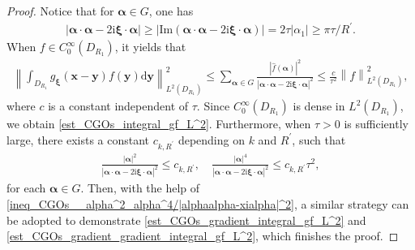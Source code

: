 \documentclass[11pt,reqno,oneside]{amsart}
\theoremstyle{definition}
\theoremstyle{remark}
\numberwithin{equation}{section}
\numberwithin{equation}{section}
\theoremstyle{remark}
\begin{document}
\begin{proof}
	Notice that for $ \bm{\alpha} \in G $, one has
	\begin{align} \label{ineq_CGOs_alphaalpha-2ixialpha}
		\left| \bm{\alpha} \cdot \bm{\alpha} - 2 \mathrm{i} \bm{\xi} \cdot \bm{\alpha} \right| \geqslant \left| \mathrm{Im}\left(\bm{\alpha} \cdot \bm{\alpha} - 2 \mathrm{i} \bm{\xi} \cdot \bm{\alpha}\right)\right| = 2 \tau \left| \alpha_1 \right| \geqslant \pi \tau/R^{\prime}.
	\end{align}
	When $ f \in C^{\infty}_0 \left(D_{R_1}\right) $, it yields that 
	\begin{align*}
		\left\| \int_{D_{R_1}} g_{\bm{\xi}} \left(\mathbf{x} - \mathbf{y}\right) f \left(\mathbf{y}\right) \mathrm{d} \mathbf{y} \right\|^2_{L^2\left(D_{R_1}\right)} \leqslant \sum_{\bm{\alpha} \in G} \frac{\left|\hat{f}\left(\bm{\alpha}\right)\right|^2}{\left|\bm{\alpha} \cdot \bm{\alpha} - 2\mathrm{i} \bm{\xi} \cdot \bm{\alpha}\right|^2} \leqslant \frac{c}{\tau^2} \left\| f \right\|^2_{L^2\left(D_{R_1}\right)},
	\end{align*}
	where $ c $ is a constant independent of $ \tau $. Since $ C^{\infty}_0 \left(D_{R_1}\right) $ is dense in $ L^2\left(D_{R_1}\right) $, we obtain \eqref{est_CGOs_integral_gf_L^2}. Furthermore, when $ \tau> 0 $ is sufficiently large, there exists a constant $ c_{k,R^{\prime}} $ depending on $ k $ and $ R^{\prime} $, such that
	\begin{align} \label{ineq_CGOs__alpha^2_alpha^4/|alphaalpha-xialpha|^2}
		\frac{\left| \bm{\alpha} \right|^2}{\left|\bm{\alpha} \cdot \bm{\alpha} - 2\mathrm{i} \bm{\xi} \cdot \bm{\alpha}\right|^2} \leqslant c_{k,R^{\prime}},\quad \frac{\left| \bm{\alpha} \right|^4}{\left|\bm{\alpha} \cdot \bm{\alpha} - 2\mathrm{i} \bm{\xi} \cdot \bm{\alpha}\right|^2} \leqslant c_{k,R^{\prime}} \tau^2,
	\end{align}
	for each $ \bm{\alpha} \in G $. Then, with the help of \eqref{ineq_CGOs__alpha^2_alpha^4/|alphaalpha-xialpha|^2}, a similar strategy can be adopted to demonstrate \eqref{est_CGOs_gradient_integral_gf_L^2} and \eqref{est_CGOs_gradient_gradient_integral_gf_L^2}, which finishes the proof.
\end{proof}
\end{document}
